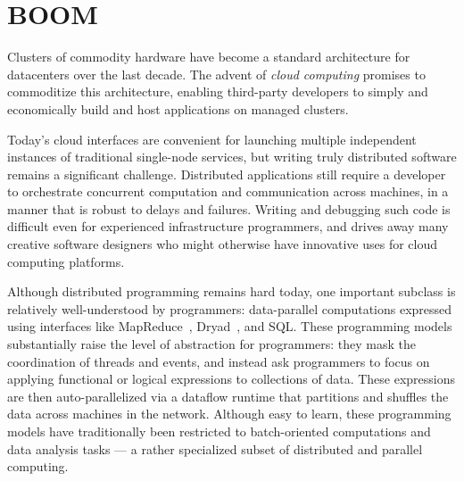 \section{BOOM}

Clusters of commodity hardware have become a standard architecture for
datacenters over the last decade.
The advent of \emph{cloud computing} promises to commoditize
this architecture, enabling third-party
developers to simply and economically build and host applications on managed clusters.  

Today's cloud interfaces are convenient for launching multiple independent
instances of traditional single-node services, but writing truly distributed
software remains a significant challenge.  Distributed applications still
require a developer to orchestrate concurrent computation and communication
across machines, in a manner that is robust to delays and failures.  Writing and
debugging such code is difficult even for experienced infrastructure
programmers, and drives away many creative software designers who might
otherwise have innovative uses for cloud computing platforms.





Although distributed programming remains hard today, one important subclass is
relatively well-understood by programmers: data-parallel computations expressed
using interfaces like MapReduce~\cite{mapreduce-osdi}, Dryad~\cite{dryad}, and
SQL\@.  These programming models substantially raise the level of abstraction
for programmers: they mask the coordination of threads and events, and instead
ask programmers to focus on applying functional or logical expressions to
collections of data.  These expressions are then auto-parallelized via a
dataflow runtime that partitions and shuffles the data across machines in the
network. Although easy to learn, these programming models have traditionally
been restricted to batch-oriented computations and data analysis tasks --- a
rather specialized subset of distributed and parallel computing.

